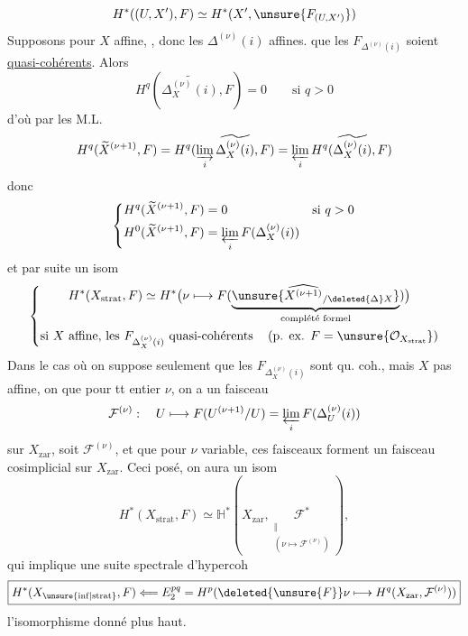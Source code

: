 \[
H^*((U,X'),F)\simeq H^*(X',\unsure{F_{(U,X')}})
\]
Supposons pour  $X$ affine, , donc les $\Delta^{(\nu)}(i)$ affines.  que les $F_{\Delta^{(\nu)}(i)}$ soient \uline{quasi-cohérents}. Alors 
\[
H^q(\widetilde{\Delta_X^{(\nu)}(i)},F)=0\qquad\text{si }q>0
\]
d'où par les  M.L.
\[
H^q(\widetilde X^{(\nu+1)},F)
=H^q(\varinjlim_i\widetilde{\Delta_X^{(\nu)}(i)},F)
=\varprojlim_i H^q(\widetilde{\Delta_X^{(\nu)}(i)},F)
\]
donc
\[
\left\{\begin{aligned}
H^q(\widetilde X^{(\nu+1)},F)&=0&&\text{si }q>0\\
H^0(\widetilde X^{(\nu+1)},F)&=\varprojlim_i F(\Delta_X^{(\nu)}(i))
\end{aligned}\right.
\]
et par suite un isom 
\[
\left\{\begin{gathered}
H^*(X_{\mathrm{strat}},F)\simeq
H^*\bigl(\nu\longmapsto F(\underbrace{\unsure{\widehat{X^{(\nu+1)}}_{/\deleted{\Delta}X}}}_{\text{complété formel}})\bigr)\\
\text{si $X$ affine, les $F_{\Delta_X^{(\nu)}(i)}$ quasi-cohérents}\quad
\left(\text{p. ex. }F=\unsure{\mathcal O_{X_{\mathrm{strat}}}}\right)
\end{gathered}\right.
\]
Dans le cas où on suppose seulement que les $F_{\Delta_X^{(\nu)}(i)}$ sont qu. coh., mais $X$ pas  affine, on  que pour tt entier $\nu$, on a un
faisceau
\[
\mathcal F^{(\nu)}:\quad U\longmapsto F(U^{(\nu+1)}/U)=\varprojlim_i F(\Delta_U^{(\nu)}(i))
\]
sur $X_{\mathrm{zar}}$, soit $\mathcal F^{(\nu)}$, et que pour $\nu$ variable, ces faisceaux forment un faisceau cosimplicial sur $X_{\mathrm{zar}}$. Ceci posé, on aura un isom
\[
H^*(X_{\mathrm{strat}},F)\simeq\mathbb H^*(X_{\mathrm{zar}},\underset{\substack{\Vert\\(\nu\mapsto\mathcal F^{(\nu)})}}{\mathcal F^*}),
\]
qui implique une suite spectrale d'hypercoh
\[
\boxed{H^*(X_{\unsure{\mathrm{inf}|\mathrm{strat}}},F)\Longleftarrow
E_2^{pq}=H^p(\deleted{\unsure{F}}\nu\longmapsto H^q(X_{\mathrm{zar}},\mathcal F^{(\nu)}))}
\]
 l'isomorphisme donné plus haut.


